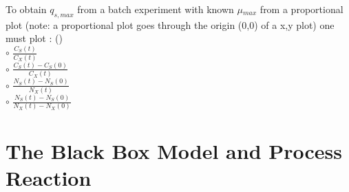 \documentclass[]{beamer}
\begin{document}
\begin{frame}[shrink] {} 
\color{blue}
    
 To obtain $q_{s,max}$ from a batch experiment with known $\mu$$_{max}$ from a proportional plot (note: a proportional plot goes through the origin (0,0) of a x,y plot) one must plot :  ({\color{green}{Q11}})\\[0.5em]
\color{black}
\setlength{\parindent}{-0.4cm}
{\color{red}$\circ$} $\frac{C_S(t)}{C_X(t)}$  \\[0.3em]
{\color{red}$\circ$} $\frac{C_S(t)-C_S(0)}{C_X(t)}$  \\[0.3em]
{\color{red}$\circ$} $\frac{N_S(t)-N_S(0)}{N_X(t)}$  \\[0.3em]
{\color{red}$\circ$} $\frac{N_S(t)-N_S(0)}{N_X(t)-N_X(0)}$  \\[0.3em]
\end{frame}


\section{The Black Box Model and Process Reaction}
\end{document}
